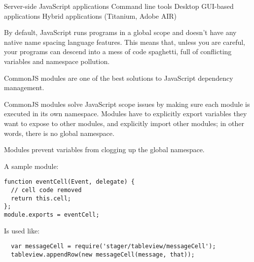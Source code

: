 Server-side JavaScript applications
Command line tools
Desktop GUI-based applications
Hybrid applications (Titanium, Adobe AIR)



By default, JavaScript runs programs in a global scope and doesn't have any native name spacing language features. This means that, unless you are careful, your programs can descend into a mess of code spaghetti, full of conflicting variables and namespace pollution.

CommonJS modules are one of the best solutions to JavaScript dependency management.

CommonJS modules solve JavaScript scope issues by making sure each module is executed in its own namespace. Modules have to explicitly export variables they want to expose to other modules, and explicitly import other modules; in other words, there is no global namespace.

Modules prevent variables from clogging up the global namespace.


A sample module:


\begin{verbatim}
function eventCell(Event, delegate) {
  // cell code removed
  return this.cell;
};
module.exports = eventCell;
\end{verbatim}

Is used like:
\begin{verbatim}
  var messageCell = require('stager/tableview/messageCell');
  tableview.appendRow(new messageCell(message, that));
\end{verbatim}


%
%


